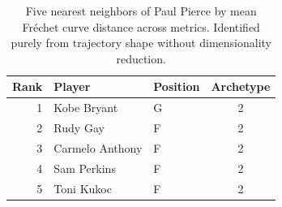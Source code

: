\begin{table}[htbp]
  \centering\small
  \begin{tabular}{rllc}
    \toprule
    Rank & Player & Position & Archetype \\
    \midrule
    1 & Kobe Bryant & G & 2 \\
    2 & Rudy Gay & F & 2 \\
    3 & Carmelo Anthony & F & 2 \\
    4 & Sam Perkins & F & 2 \\
    5 & Toni Kukoc & F & 2 \\
    \bottomrule
  \end{tabular}
  \caption{Five nearest neighbors of Paul Pierce by mean Fr\'{e}chet curve distance across metrics. Identified purely from trajectory shape without dimensionality reduction.}
  \label{tab:Paul_Pierce_frechet_curve_neighbors}
\end{table}

